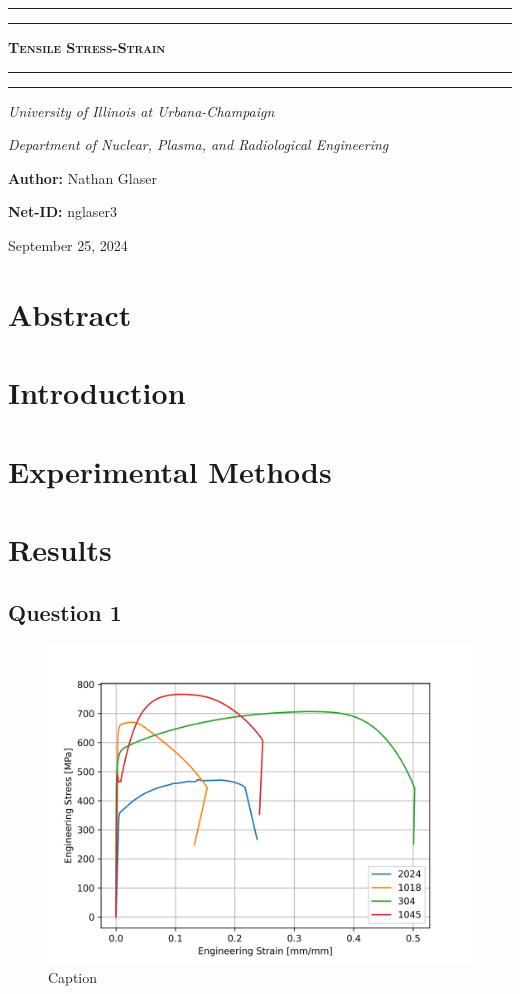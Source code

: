 \documentclass{article}
\begin{document}
\begin{titlepage}

\centering
\scshape
\vspace{\baselineskip}

%
\rule{\textwidth}{1.6pt}\vspace*{-\baselineskip}\vspace*{2pt}
\rule{\textwidth}{0.4pt}

{\Huge \textbf{\textsc{ Tensile Stress-Strain \\
\vspace{15pt}}}}

\rule{\textwidth}{0.4pt}\vspace*{-\baselineskip}\vspace{3.2pt}
\rule{\textwidth}{1.6pt}\vspace{6pt}
\centerline{\textit{University of Illinois at Urbana-Champaign}} 
\centerline{\textit{Department of Nuclear, Plasma, and Radiological Engineering}}
\vspace{1.5\baselineskip}


\large \centerline{\textbf{Author:} Nathan Glaser}
\large \centerline{\textbf{Net-ID:} nglaser3}
\quad

\vfill
\large \centerline{September 25, 2024}
%
\end{titlepage}

\tableofcontents
\newpage
{}

\section{Abstract}

\newpage
\section{Introduction}

\newpage
\section{Experimental Methods}

\newpage
\section{Results}

\subsection{Question 1}
\begin{figure}[!h!]
    \centering
    \includegraphics[width=0.5\linewidth]{plots/q1all.png}
    \caption{Caption}
    \label{fig:q1all}
\end{figure}
\end{document}
